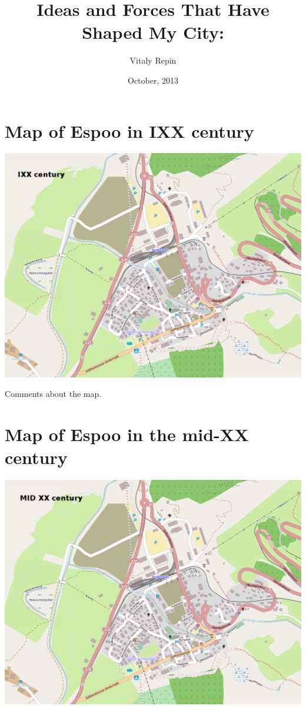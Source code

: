 \documentclass[a4paper]{article}
\author{Vitaly Repin}
\title{Ideas and Forces That Have Shaped My City: \emph{\mycity}}
\date{October, 2013}
\newcommand{\mycity}{Espoo\xspace}
\begin{document}

\section{Map of \mycity in IXX century}
\includegraphics[keepaspectratio,width=\textwidth]{map1}

Comments about the map.

\newpage

\section{Map of \mycity in the mid-XX century}
\includegraphics[keepaspectratio,width=\textwidth]{map2}
\end{document}
